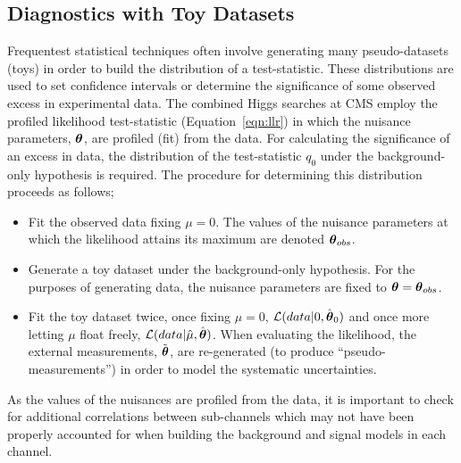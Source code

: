 \subsection{Diagnostics with Toy Datasets}
\label{sec:diagnostics}
Frequentest statistical techniques often involve generating many pseudo-datasets (toys)
in order to build the distribution of a test-statistic. 
These distributions are used to set confidence intervals or determine the significance of
some observed excess in experimental data. The combined Higgs searches at CMS employ the
profiled likelihood test-statistic (Equation~\ref{eqn:llr}) in which the nuisance parameters,
${\boldsymbol{\theta}}$, are profiled (fit) from the data. 
For calculating the significance of an excess in data, the distribution
of the test-statistic $q_{0}$ under the background-only hypothesis is required. 
The procedure for determining this distribution proceeds as follows;

\begin{itemize}
\item{Fit the observed data fixing $\mu=0$. The values of the nuisance parameters 
at which the likelihood attains its maximum are denoted ${\boldsymbol{\theta}}_{obs}$.}
\item{Generate a toy dataset under the background-only hypothesis. For the purposes of
generating data, the nuisance parameters are fixed to ${\boldsymbol{\theta}}={\boldsymbol{\theta}}_{obs}$.}
\item{Fit the toy dataset twice, once fixing $\mu=0$, $\mathcal{L}(data|0,\hat{{\boldsymbol{\theta}}}_{0})$ 
and once more letting 
$\mu$ float freely, $\mathcal{L}(data|\hat{\mu},\hat{{\boldsymbol{\theta}}})$. When 
evaluating the likelihood, the external measurements, $\tilde{{\boldsymbol{\theta}}}$, are re-generated 
(to produce ``pseudo-measurements'') in order to model the systematic uncertainties.}
\end{itemize}
As the values of the nuisances are profiled from the data, it is important to 
check for additional correlations between sub-channels which may not have 
been properly accounted for when building the background and signal models in
each channel.

